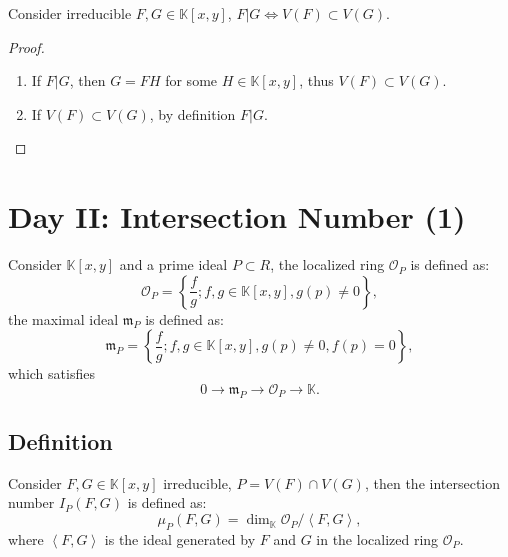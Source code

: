 \documentclass[10pt]{article}
\begin{document}
\begin{theorem}
  Consider irreducible $ F, G \in \mathbb{K}[x,y]$, $ F | G \Leftrightarrow V(F) \subset V(G)$.
\end{theorem}
\begin{proof}
  \begin{enumerate}[(1)]
    \item If $ F | G$, then $ G = F H$ for some $ H \in \mathbb{K}[x,y]$, thus $ V(F) \subset V(G)$.
    \item If $ V(F) \subset V(G)$, by definition $ F | G$.
  \end{enumerate}
\end{proof}

\section{Day II: Intersection Number (1)}

\begin{definition}
  Consider $ \mathbb{K}[x,y]$ and a prime ideal $ P \subset R$, the localized ring $ \mathcal{O}_P$ is defined as:
  \begin{equation*}
    \mathcal{O}_P = \left\{ \frac{f}{g} ; f, g \in \mathbb{K}[x,y] , g(p) \neq 0 \right\},
  \end{equation*}
  the maximal ideal $ \mathfrak{m}_P$ is defined as:
  \begin{equation*}
    \mathfrak{m}_P = \left\{ \frac{f}{g} ; f,g \in \mathbb{K}[x,y] , g(p) \neq 0 , f(p) = 0\right\},
  \end{equation*}
  which satisfies
  \begin{equation*}
    0 \rightarrow \mathfrak{m}_P \rightarrow \mathcal{O}_P \rightarrow \mathbb{K}.
  \end{equation*}
\end{definition}

\subsection{Definition}

\begin{definition}
  Consider $ F, G \in \mathbb{K}[x,y]$ irreducible, $ P = V(F) \cap V(G)$, then the intersection number $ I_P(F,G)$ is defined as:
  \begin{equation*}
    \mu_{P}(F,G) = \dim_{\mathbb{K}} \mathcal{O}_P / \left< F,G \right>,
  \end{equation*}
  where $\left< F,G \right>$ is the ideal generated by $ F$ and $ G$ in the localized ring $ \mathcal{O}_P$.
\end{definition}
\end{document}
